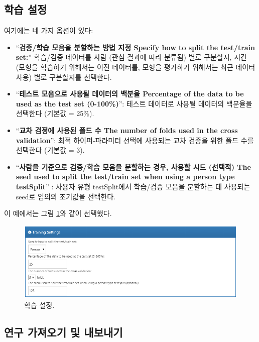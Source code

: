 \documentclass[10.5pt]{book}
\providecommand{\tightlist}{%
  \setlength{\itemsep}{0pt}\setlength{\parskip}{0pt}}
\theoremstyle{definition}
\theoremstyle{definition}
\theoremstyle{definition}
\theoremstyle{remark}
\begin{document}
\subsection{학습 설정}\label{-}

여기에는 네 가지 옵션이 있다:

\begin{itemize}
\tightlist
\item
  ``\textbf{검증/학습 모음을 분할하는 방법 지정 Specify how to split the
  test/train set:}'' 학습/검증 데이터를 사람 (관심 결과에 따라 분류됨)
  별로 구분할지, 시간 (모형을 학습하기 위해서는 이전 데이터를, 모형을
  평가하기 위해서는 최근 데이터 사용) 별로 구분할지를 선택한다.
\item
  ``\textbf{테스트 모음으로 사용될 데이터의 백분율 Percentage of the
  data to be used as the test set (0-100\%)}'': 테스트 데이터로 사용될
  데이터의 백분율을 선택한다 (기본값 = 25\%).
\item
  ``\textbf{교차 검정에 사용된 폴드 수 The number of folds used in the
  cross validation}'': 최적 하이퍼-파라미터 선택에 사용되는 교차 검증을
  위한 폴드 수를 선택한다 (기본값 = 3).
\item
  ``\textbf{사람을 기준으로 검증/학습 모음을 분할하는 경우, 사용할 시드
  (선택적) The seed used to split the test/train set when using a person
  type testSplit}'' : 사용자 유형 testSplit에서 학습/검증 모음을
  분할하는 데 사용되는 seed로 임의의 초기값을 선택한다.
\end{itemize}

이 예에서는 그림 \ref{fig:trainingSettings}와 같이 선택했다.

\begin{figure}

{\centering \includegraphics[width=1\linewidth]{images/PatientLevelPrediction/trainingSettings} 

}

\caption{학습 설정.}\label{fig:trainingSettings}
\end{figure}

\subsection{연구 가져오기 및 내보내기}\label{---}
\end{document}
